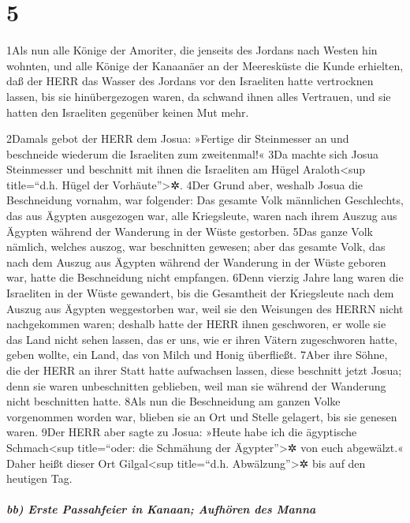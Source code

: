 \hypertarget{section-4}{%
\section{5}\label{section-4}}

1Als nun alle Könige der Amoriter, die jenseits des Jordans nach Westen
hin wohnten, und alle Könige der Kanaanäer an der Meeresküste die Kunde
erhielten, daß der HERR das Wasser des Jordans vor den Israeliten hatte
vertrocknen lassen, bis sie hinübergezogen waren, da schwand ihnen alles
Vertrauen, und sie hatten den Israeliten gegenüber keinen Mut mehr.

2Damals gebot der HERR dem Josua: »Fertige dir Steinmesser an und
beschneide wiederum die Israeliten zum zweitenmal!« 3Da machte sich
Josua Steinmesser und beschnitt mit ihnen die Israeliten am Hügel
Araloth\textless sup title=``d.h. Hügel der Vorhäute''\textgreater✲.
4Der Grund aber, weshalb Josua die Beschneidung vornahm, war folgender:
Das gesamte Volk männlichen Geschlechts, das aus Ägypten ausgezogen war,
alle Kriegsleute, waren nach ihrem Auszug aus Ägypten während der
Wanderung in der Wüste gestorben. 5Das ganze Volk nämlich, welches
auszog, war beschnitten gewesen; aber das gesamte Volk, das nach dem
Auszug aus Ägypten während der Wanderung in der Wüste geboren war, hatte
die Beschneidung nicht empfangen. 6Denn vierzig Jahre lang waren die
Israeliten in der Wüste gewandert, bis die Gesamtheit der Kriegsleute
nach dem Auszug aus Ägypten weggestorben war, weil sie den Weisungen des
HERRN nicht nachgekommen waren; deshalb hatte der HERR ihnen geschworen,
er wolle sie das Land nicht sehen lassen, das er uns, wie er ihren
Vätern zugeschworen hatte, geben wollte, ein Land, das von Milch und
Honig überfließt. 7Aber ihre Söhne, die der HERR an ihrer Statt hatte
aufwachsen lassen, diese beschnitt jetzt Josua; denn sie waren
unbeschnitten geblieben, weil man sie während der Wanderung nicht
beschnitten hatte. 8Als nun die Beschneidung am ganzen Volke vorgenommen
worden war, blieben sie an Ort und Stelle gelagert, bis sie genesen
waren. 9Der HERR aber sagte zu Josua: »Heute habe ich die ägyptische
Schmach\textless sup title=``oder: die Schmähung der
Ägypter''\textgreater✲ von euch abgewälzt.« Daher heißt dieser Ort
Gilgal\textless sup title=``d.h. Abwälzung''\textgreater✲ bis auf den
heutigen Tag.

\hypertarget{bb-erste-passahfeier-in-kanaan-aufhuxf6ren-des-manna}{%
\subparagraph{bb) Erste Passahfeier in Kanaan; Aufhören des
Manna}\label{bb-erste-passahfeier-in-kanaan-aufhuxf6ren-des-manna}}

